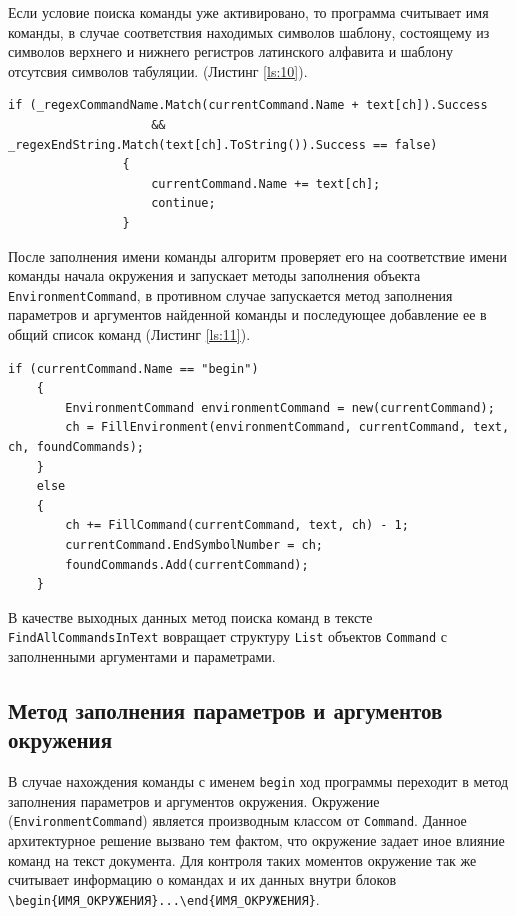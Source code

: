  Если условие поиска команды уже активировано, то программа считывает имя команды, в случае соответствия находимых символов шаблону, состоящему из символов верхнего и нижнего регистров латинского алфавита и шаблону отсутсвия символов табуляции. (Листинг \ref{ls:10}).

\begin{lstlisting}[caption={Условие поиска окончания записи имени команды по шаблону соответствия}, label={ls:10}]
      if (_regexCommandName.Match(currentCommand.Name + text[ch]).Success
                    && _regexEndString.Match(text[ch].ToString()).Success == false)
                {
                    currentCommand.Name += text[ch];
                    continue;
                }
\end{lstlisting}

 После заполнения имени команды алгоритм проверяет его на соответствие имени команды начала окружения и запускает методы заполнения объекта \verb|EnvironmentCommand|, в противном случае запускается метод заполнения параметров и аргументов найденной команды и последующее добавление ее в общий список команд (Листинг \ref{ls:11}).  
\begin{lstlisting}[caption={Условие вхождения поиска аргумнетов и параметров или заполнения окружения после окончания поиска имени команды}, label={ls:11}]
    if (currentCommand.Name == "begin")
    {
        EnvironmentCommand environmentCommand = new(currentCommand);
        ch = FillEnvironment(environmentCommand, currentCommand, text, ch, foundCommands);
    }
    else
    {
        ch += FillCommand(currentCommand, text, ch) - 1;
        currentCommand.EndSymbolNumber = ch;
        foundCommands.Add(currentCommand);
    }
\end{lstlisting}

В качестве выходных данных метод поиска команд в тексте \verb|FindAllCommandsInText| вовращает структуру \verb|List| объектов \verb|Command| с заполненными аргументами и параметрами. 

\subsection{Метод заполнения параметров и аргументов окружения}
В случае нахождения команды с именем \verb|begin| ход программы переходит в метод заполнения параметров и аргументов окружения. Окружение (\verb|EnvironmentCommand|) является производным классом от \verb|Command|. Данное архитектурное решение вызвано тем фактом, что окружение задает иное влияние команд на текст документа. Для контроля таких моментов окружение так же считывает информацию о командах и их данных внутри блоков \verb|\begin{ИМЯ_ОКРУЖЕНИЯ}...\end{ИМЯ_ОКРУЖЕНИЯ}|.


